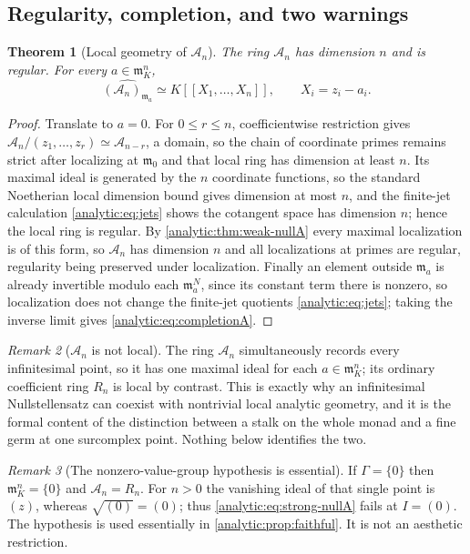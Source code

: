 \documentclass[11pt,letterpaper]{article}
\newtheorem{theorem}{Theorem}[section]
\theoremstyle{definition}
\theoremstyle{remark}
\newtheorem{remark}[theorem]{Remark}
\newcommand{\A}{\mathscr A}
\newcommand{\m}{\mathfrak m}
\numberwithin{equation}{section}
\begin{document}
\subsection{Regularity, completion, and two warnings}
\begin{theorem}[Local geometry of $\A_n$]\label{analytic:thm:regularA}
The ring $\A_n$ has dimension $n$ and is regular. For every $a\in\m_K^n$,
\begin{equation}\label{analytic:eq:completionA}
 \widehat{(\A_n)_{\m_a}}\simeq K[[X_1,\ldots,X_n]],\qquad X_i=z_i-a_i .
\end{equation}
\end{theorem}
\begin{proof}
Translate to $a=0$. For $0\le r\le n$, coefficientwise restriction gives
$\A_n/(z_1,\ldots,z_r)\simeq\A_{n-r}$, a domain, so the chain of coordinate
primes remains strict after localizing at $\m_0$ and that local ring has
dimension at least $n$. Its maximal ideal is generated by the $n$ coordinate
functions, so the standard Noetherian local dimension bound gives dimension
at most $n$, and the finite-jet calculation \eqref{analytic:eq:jets} shows
the cotangent space has dimension $n$; hence the local ring is regular. By
\cref{analytic:thm:weak-nullA} every maximal localization is of this form,
so $\A_n$ has dimension $n$ and all localizations at primes are regular,
regularity being preserved under localization. Finally an element outside
$\m_a$ is already invertible modulo each $\m_a^N$, since its constant term
there is nonzero, so localization does not change the finite-jet quotients
\eqref{analytic:eq:jets}; taking the inverse limit gives
\eqref{analytic:eq:completionA}.
\end{proof}

\begin{remark}[$\A_n$ is not local]\label{analytic:rem:nonlocalA}
The ring $\A_n$ simultaneously records every infinitesimal point, so it has
one maximal ideal for each $a\in\m_K^n$; its ordinary coefficient ring $R_n$
is local by contrast. This is exactly why an infinitesimal Nullstellensatz
can coexist with nontrivial local analytic geometry, and it is the formal
content of the distinction between a stalk on the whole monad and a fine
germ at one surcomplex point. Nothing below identifies the two.
\end{remark}

\begin{remark}[The nonzero-value-group hypothesis is essential]
\label{analytic:rem:trivial-group}
If $\Gamma=\{0\}$ then $\m_K^n=\{0\}$ and $\A_n=R_n$. For $n>0$ the
vanishing ideal of that single point is $(z)$, whereas $\sqrt{(0)}=(0)$;
thus \eqref{analytic:eq:strong-nullA} fails at $I=(0)$. The hypothesis is
used essentially in \cref{analytic:prop:faithful}. It is not an aesthetic
restriction.
\end{remark}
\end{document}
